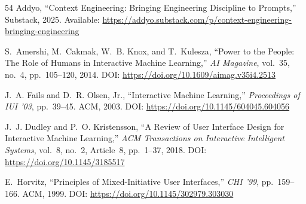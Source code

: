 \documentclass[acmlarge,nonacm,screen]{acmart}
\begin{document}
\begin{thebibliography}{54}
Addyo,
``Context Engineering: Bringing Engineering Discipline to Prompts,''
Substack, 2025.
\newline Available: \url{https://addyo.substack.com/p/context-engineering-bringing-engineering}




S.~Amershi, M.~Cakmak, W.~B. Knox, and T.~Kulesza,
``Power to the People: The Role of Humans in Interactive Machine Learning,''
\textit{AI Magazine}, vol.~35, no.~4, pp.~105--120, 2014.
\newline DOI: \url{https://doi.org/10.1609/aimag.v35i4.2513}

J.~A. Fails and D.~R. Olsen, Jr.,
``Interactive Machine Learning,''
\textit{Proceedings of IUI '03}, pp.~39--45. ACM, 2003.
\newline DOI: \url{https://doi.org/10.1145/604045.604056}

J.~J. Dudley and P.~O. Kristensson,
``A Review of User Interface Design for Interactive Machine Learning,''
\textit{ACM Transactions on Interactive Intelligent Systems}, vol.~8, no.~2, Article~8, pp.~1--37, 2018.
\newline DOI: \url{https://doi.org/10.1145/3185517}


E.~Horvitz,
``Principles of Mixed-Initiative User Interfaces,''
\textit{CHI '99}, pp.~159--166. ACM, 1999.
\newline DOI: \url{https://doi.org/10.1145/302979.303030}


\end{thebibliography}
\end{document}
